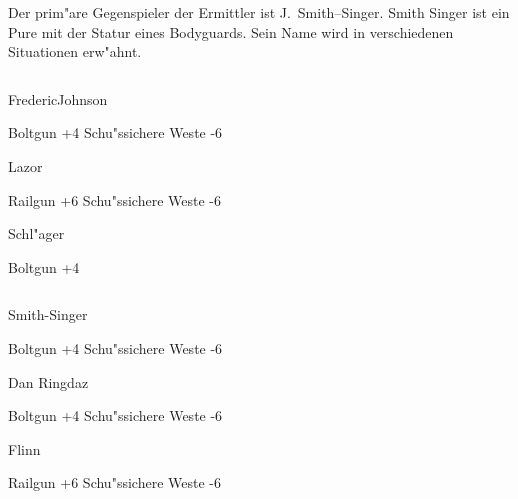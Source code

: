 Der prim"are Gegenspieler der Ermittler ist J.~Smith--Singer. Smith Singer ist ein Pure mit der Statur eines Bodyguards. Sein Name wird in verschiedenen Situationen erw"ahnt.
\vfill
\pagebreak

\begin{column}[l]{0.45}
    \begin{nscsheet}[h]{Frederic\newline{}Johnson}
        \nscstats[ATT=3,AGG=4,EMP=4,KNO=5,HP=10]
        \nscruler
        \begin{nscinventory}
            \nscitem[Waffen] Boltgun +4
            \nscitem[R"ustung] Schu"ssichere Weste -6           
        \end{nscinventory}
    \end{nscsheet}

    \begin{nscsheet}[h]{Lazor}
        \nscstats[ATT=6,AGG=5,EMP=2,KNO=4,HP=12]
        \nscruler
        \begin{nscinventory}
            \nscitem[Waffen] Railgun +6
            \nscitem[R"ustung] Schu"ssichere Weste -6           
        \end{nscinventory}
    \end{nscsheet}


    \begin{nscsheet}[h]{Schl"ager}
        \nscstats[ATT=3,AGG=2,EMP=1,KNO=1,HP=10]
        \nscruler
        \begin{nscinventory}
            \nscitem[Waffen] Boltgun +4            
        \end{nscinventory}
    \end{nscsheet}    
\end{column}
\begin{column}[r]{0.45}
    \begin{nscsheet}[h]{Smith-Singer}
        \nscstats[ATT=7,AGG=7,EMP=7,KNO=5,HP=12]
        \nscruler
        \begin{nscinventory}
            \nscitem[Waffen] Boltgun +4
            \nscitem[R"ustung] Schu"ssichere Weste -6           
        \end{nscinventory}
    \end{nscsheet}

    \begin{nscsheet}[h]{Dan Ringdaz}
        \nscstats[ATT=4,AGG=4,EMP=4,KNO=5,HP=10]
        \nscruler
        \begin{nscinventory}
            \nscitem[Waffen] Boltgun +4
            \nscitem[R"ustung] Schu"ssichere Weste -6           
        \end{nscinventory}
    \end{nscsheet}

    \begin{nscsheet}[h]{Flinn}
        \nscstats[ATT=6,AGG=5,EMP=2,KNO=4,HP=12]
        \nscruler
        \begin{nscinventory}
            \nscitem[Waffen] Railgun +6
            \nscitem[R"ustung] Schu"ssichere Weste -6           
        \end{nscinventory}
    \end{nscsheet}
\end{column}
